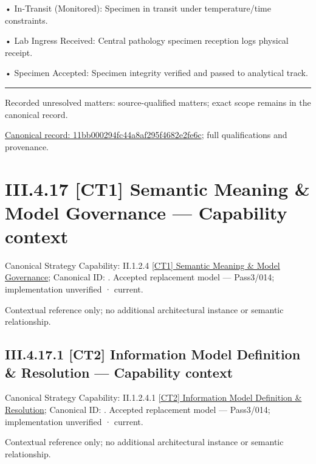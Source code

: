 •
In-Transit (Monitored): Specimen in transit under temperature/time constraints.



•
Lab Ingress Received: Central pathology specimen reception logs physical receipt.



•
Specimen Accepted: Specimen integrity verified and passed to analytical track.



\medskip\hrule\medskip

{\small Recorded unresolved matters: source-qualified matters; exact scope remains in the canonical record.}\par
{\footnotesize \href{../../../../../../../../continuum/business/business-process/11bb000294fc44a8af295f4682e2fe6c.md}{Canonical record: 11bb000294fc44a8af295f4682e2fe6c}; full qualifications and provenance.}\par
\section*{III.4.17 [CT1] Semantic Meaning \& Model Governance — Capability context}
\label{navigation:III.4.17}

{\small Canonical Strategy Capability: II.1.2.4 \hyperref[element:cc25d325f7104ccda137cbf6ee371fb3]{[CT1] Semantic Meaning \& Model Governance}; Canonical ID: \texttt{}. Accepted replacement model — Pass3/014; implementation unverified · current.}\par
Contextual reference only; no additional architectural instance or semantic relationship.\par
\subsection*{III.4.17.1 [CT2] Information Model Definition \& Resolution — Capability context}
\label{navigation:III.4.17.1}

{\small Canonical Strategy Capability: II.1.2.4.1 \hyperref[element:9f077356ba9342d6a9b87437fa7210e8]{[CT2] Information Model Definition \& Resolution}; Canonical ID: \texttt{}. Accepted replacement model — Pass3/014; implementation unverified · current.}\par
Contextual reference only; no additional architectural instance or semantic relationship.\par
